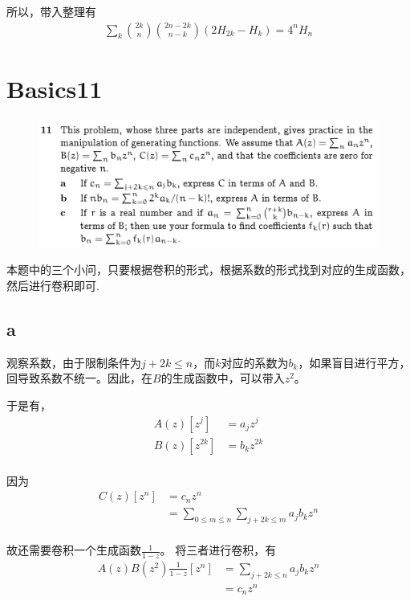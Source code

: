 \documentclass[]{article}
\begin{document}
所以，带入整理有
\begin{align}
    \sum_{k}\binom{2k}{n}\binom{2n-2k}{n-k}(2H_{2k} - H_{k}) = 4^n H_{n}
\end{align}


\section{Basics11}
\begin{figure}[H]
    \includegraphics[scale = 0.3]{2023-05-06-17-45-41.png}
\end{figure}
本题中的三个小问，只要根据卷积的形式，根据系数的形式找到对应的生成函数，然后进行卷积即可.\par 
\subsection*{a}
观察系数，由于限制条件为$j + 2k \le n$，而$k$对应的系数为$b_{k}$，如果盲目进行平方，回导致系数不统一。因此，在$B$的生成函数中，可以带入$z^2$。\par 
于是有，
\begin{align}
    A(z)[z^{j}] &= a_jz^j\\
    B(z)[z^{2k}] &= b_kz^{2k}\\
\end{align}

因为
\begin{align}
    C(z)[z^n] &= c_nz^n\\
    &=\sum_{0 \le m \le n} \sum_{j+2k\le m}a_jb_kz^n\\
\end{align}

故还需要卷积一个生成函数$\frac{1}{1-z}$。
将三者进行卷积，有
\begin{align}
    A(z)B(z^2)\frac{1}{1-z}[z^n] &= \sum_{j+2k \le n} a_jb_kz^n\\
    &=c_nz^n\\
\end{align}
\end{document}
